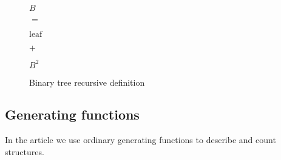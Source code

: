 \documentclass[final]{article}
\theoremstyle{definition}
\theoremstyle{remark}
\begin{document}
\begin{figure}[h]
    \begin{center}
        \begin{minipage}[t]{.2\textwidth}
            \begin{center}
                \(B\)\\
            \end{center}
        \end{minipage}%
        \begin{minipage}[t]{.05\textwidth}
            \begin{center}
                \(=\)\\
            \end{center}
        \end{minipage}%
        \begin{minipage}[t]{.2\textwidth}
            \begin{center}
                \(\text{leaf}\)\\
            \end{center}
        \end{minipage}%
        \begin{minipage}[t]{.05\textwidth}
            \begin{center}
                \(+\)\\
            \end{center}
        \end{minipage}%
        \begin{minipage}[t]{.2\textwidth}
            \begin{center}
                \(B^2\)\\
            \end{center}
        \end{minipage}%
    \end{center}
    \caption{Binary tree recursive definition}
    \label{fig:binary_recursion}
\end{figure}

\subsection{Generating functions}%
\label{sub:generating_functions}

In the article we use ordinary generating functions to describe and count structures.
\end{document}
